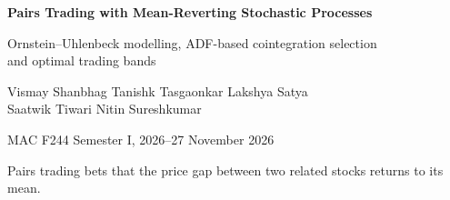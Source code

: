 \begin{frame}[plain]
\centering\vspace{8pt}
{\color{deckInk}\Large\bfseries Pairs Trading with Mean-Reverting Stochastic Processes\par}
\vspace{2pt}
{\color{deckInk!75}\normalsize Ornstein--Uhlenbeck modelling, ADF-based cointegration selection\\and optimal trading bands\par}
\vspace{5pt}
{\small\color{deckInk}Vismay Shanbhag \quad Tanishk Tasgaonkar \quad Lakshya Satya\\
Saatwik Tiwari \quad Nitin Sureshkumar\par}
\vspace{2pt}
{\footnotesize\color{deckMuted}MAC F244 \quad\textbullet\quad Semester I, 2026--27 \quad\textbullet{} November 2026\par}
\vspace{10pt}
{\normalsize\color{deckInk}Pairs trading bets that the price gap between two related stocks returns to its mean.\par}
\vspace{8pt}
\begin{columns}[T,onlytextwidth]
\end{columns}
\end{frame}
